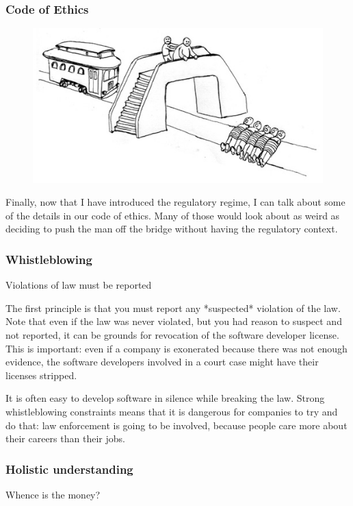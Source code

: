 \begin{frame}[fragile]
\frametitle{Code of Ethics}

\begin{figure}
\includegraphics{fat}
\end{figure}

\end{frame}

Finally,
now that I have introduced the regulatory regime,
I can talk about some of the details in our code of ethics.
Many of those would look about as weird as 
deciding to push the man off the bridge
without having the regulatory context.

\begin{frame}[fragile]
\frametitle{Whistleblowing}

Violations of law must be reported

\end{frame}

The first principle is that you must report any
*suspected*
violation of the law.
Note that even if the law was never violated,
but you had reason to suspect and not reported,
it can be grounds for revocation of the
software developer license.
This is important:
even if a company is exonerated because there was not enough evidence,
the software developers involved in a court case might have their
licenses stripped.

It is often easy to develop software in silence while breaking the law.
Strong whistleblowing constraints means that it is dangerous
for companies to try and do that:
law enforcement is going to be involved,
because people care more about their careers than their jobs.

\begin{frame}[fragile]
\frametitle{Holistic understanding}

Whence is the money?
\end{frame}


